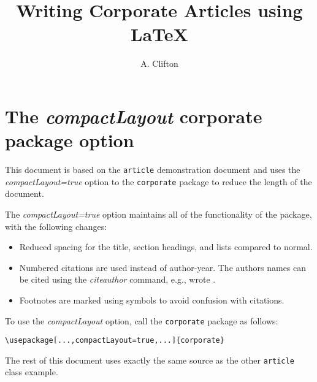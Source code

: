 \documentclass[twocolumn,a4paper]{article}
\title{Writing Corporate Articles using LaTeX}
\author{A. Clifton}
\begin{document}
\lstset{language=[LaTeX]Tex,columns=fullflexible,keepspaces=true,breaklines=true}

\section*{The \emph{compactLayout} corporate package option}

This document is based on the \texttt{article} demonstration document and uses the \emph{compactLayout=true} option to the \texttt{corporate} package to reduce the length of the document.

The \emph{compactLayout=true} option maintains all of the functionality of the package, with the following changes:
\begin{itemize}
\item Reduced spacing for the title, section headings, and lists compared to normal.
\item Numbered citations are used \citep[e.g.,][]{TechReportTest} instead of author-year. The authors names can be cited using the \emph{citeauthor} command, e.g., \citeauthor{TechReportTest} wrote \cite{TechReportTest}.
\item Footnotes are marked using symbols to avoid confusion with citations.  
\end{itemize}

To use the \emph{compactLayout} option, call the \texttt{corporate} package as follows:

\begin{lstlisting}
\usepackage[...,compactLayout=true,...]{corporate}
\end{lstlisting}

The rest of this document uses exactly the same source as the other \texttt{article} class example.

\clearpage

\maketitle



\tableofcontents
\listoffigures
\listoftables






\label{sec:TheBibliography}
\printbibliography

\appendix


\end{document}
